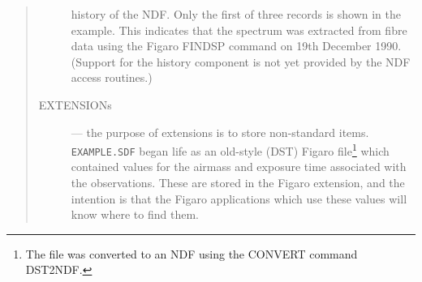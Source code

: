 \begin{quote}
\begin{description}
 history of the NDF.
 Only the first of three records is shown in the example.
 This indicates that the spectrum was extracted from fibre data using the
 Figaro FINDSP command on 19th December 1990.
 (Support for the history component is not yet provided by the NDF access 
 routines.)
\item[{EXTENSIONs}] --- the purpose of extensions is to store non-standard
 items.
 \verb+EXAMPLE.SDF+ began life as an old-style (DST) Figaro file\footnote{The
 file was converted to an NDF using the CONVERT command DST2NDF.} which
 contained values for the airmass and exposure time associated with the
 observations.
 These are stored in the Figaro extension, and the intention is that the
 Figaro applications which use these values will know where to find them.
\end{description}
\end{quote}
